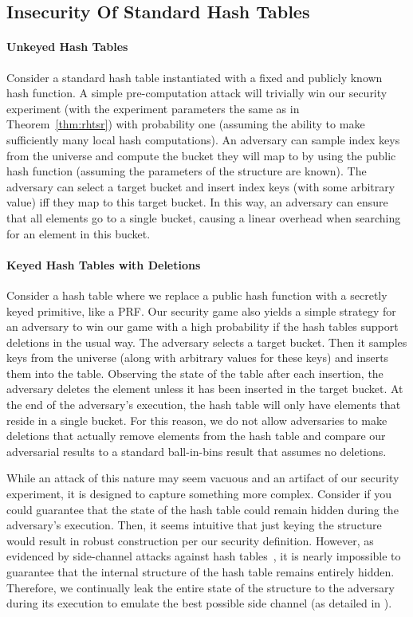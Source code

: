 \subsection{Insecurity Of Standard Hash Tables}

\paragraph{Unkeyed Hash Tables}

Consider a standard hash table instantiated with a fixed and publicly known hash function. A simple pre-computation attack will trivially win our security experiment (with the experiment parameters the same as in Theorem~\ref{thm:rhtsr}) with probability one (assuming the ability to make sufficiently many local hash computations). An adversary can sample index keys from the universe and compute the bucket they will map to by using the public hash function (assuming the parameters of the structure are known). The adversary can select a target bucket and insert index keys (with some arbitrary value) iff they map to this target bucket. In this way, an adversary can ensure that all elements go to a single bucket, causing a linear overhead when searching for an element in this bucket.

\paragraph{Keyed Hash Tables with Deletions}

Consider a hash table where we replace a public hash function with a secretly keyed primitive, like a PRF. Our security game also yields a simple strategy for an adversary to win our game with a high probability if the hash tables support deletions in the usual way. The adversary selects a target bucket. Then it samples keys from the universe (along with arbitrary values for these keys) and inserts them into the table. Observing the state of the table after each insertion, the adversary deletes the element unless it has been inserted in the target bucket. At the end of the adversary's execution, the hash table will only have elements that reside in a single bucket. For this reason, we do not allow adversaries to make deletions that actually remove elements from the hash table and compare our adversarial results to a standard ball-in-bins result that assumes no deletions. 

While an attack of this nature may seem vacuous and an artifact of our security experiment, it is designed to capture something more complex. Consider if you could guarantee that the state of the hash table could remain hidden during the adversary's execution. Then, it seems intuitive that just keying the structure would result in robust construction per our security definition. However, as evidenced by side-channel attacks against hash tables~\cite{bar2007remote}, it is nearly impossible to guarantee that the internal structure of the hash table remains entirely hidden. Therefore, we continually leak the entire state of the structure to the adversary during its execution to emulate the best possible side channel (as detailed in ). 

